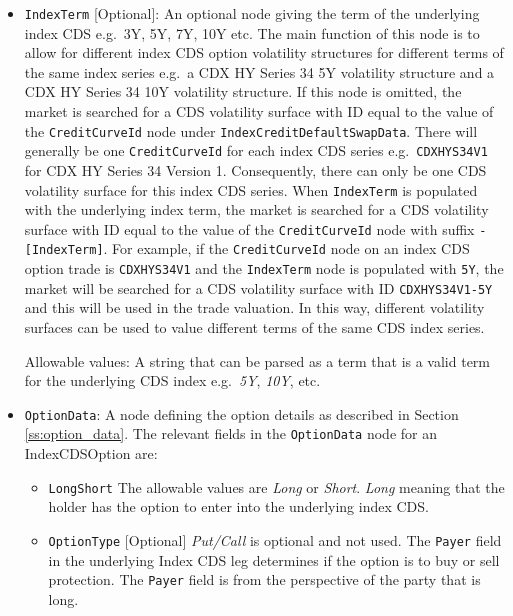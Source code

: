 \begin{itemize}

\item
\lstinline!IndexTerm! [Optional]: An optional node giving the term of the underlying index CDS e.g.\ 3Y, 5Y, 7Y, 10Y etc. The main function of this node is to allow for different index CDS option volatility structures for different terms of the same index series e.g.\ a CDX HY Series 34 5Y volatility structure and a CDX HY Series 34 10Y volatility structure. If this node is omitted, the market is searched for a CDS volatility surface with ID equal to the value of the \lstinline!CreditCurveId! node under \lstinline!IndexCreditDefaultSwapData!. There will generally be one \lstinline!CreditCurveId! for each index CDS series e.g.\ \lstinline!CDXHYS34V1! for CDX HY Series 34 Version 1. Consequently, there can only be one CDS volatility surface for this index CDS series. When \lstinline!IndexTerm! is populated with the underlying index term, the market is searched for a CDS volatility surface with ID equal to the value of the \lstinline!CreditCurveId! node with suffix \lstinline!-[IndexTerm]!. For example, if the \lstinline!CreditCurveId! node on an index CDS option trade is \lstinline!CDXHYS34V1! and the \lstinline!IndexTerm! node is populated with \lstinline!5Y!, the market will be searched for a CDS volatility surface with ID \lstinline!CDXHYS34V1-5Y! and this will be used in the trade valuation. In this way, different volatility surfaces can be used to value different terms of the same CDS index series.

Allowable values: A string that can be parsed as a term that is a valid term for the underlying CDS index e.g.\ \emph{5Y}, \emph{10Y}, etc.

\item
\lstinline!OptionData!: A node defining the option details as described in Section \ref{ss:option_data}. 
The relevant fields in the \lstinline!OptionData! node for an IndexCDSOption are:

\begin{itemize}
\item \lstinline!LongShort! The allowable values are \emph{Long} or \emph{Short}. \emph{Long} meaning that the holder has the option to enter into the underlying index CDS.

\item \lstinline!OptionType! [Optional] \emph{Put/Call} is optional and not used. The \lstinline!Payer! field in the underlying Index CDS leg  determines if the option is to buy or sell protection. The \lstinline!Payer! field is from the perspective of the party that is long. 


\end{itemize}
\end{itemize}
